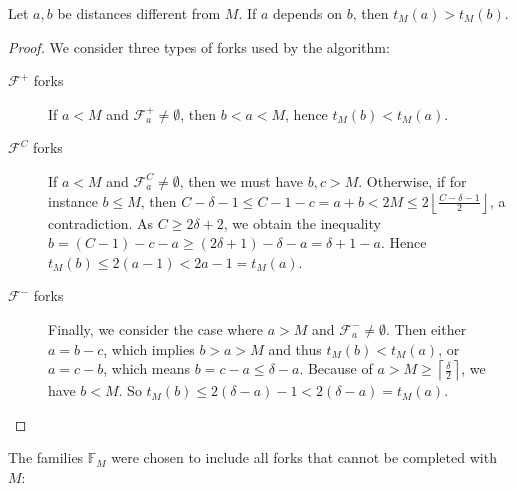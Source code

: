 \documentclass[11pt]{amsart}
\begin{document}
\begin{lemma}\label{lem:expandtime}
Let $a,b$ be distances different from $M$. If $a$ depends on $b$, then $t_M(a) > t_M(b)$.
\end{lemma}
\begin{proof}
We consider three types of forks used by the algorithm:
\begin{description}
\item[$\mathcal F^+$ forks]
If $a<M$ and $\mathcal F^+_a\neq\emptyset$, then $b<a<M$, hence $t_M(b) < t_M(a)$.

\item[$\mathcal F^C$ forks]
If $a < M$ and $\mathcal F^C_a\neq\emptyset$, then we must have $b,c > M$. Otherwise, if for instance $b\leq M$, then $C-\delta-1\leq C-1-c = a+b < 2M \leq 2\left\lfloor \frac{C-\delta-1}{2} \right\rfloor$, a contradiction. As $C\geq 2\delta+2$, we obtain the inequality $b = (C-1)-c-a \geq (2\delta + 1) - \delta - a = \delta+1-a$. Hence $t_M(b) \leq 2(a-1) < 2a-1 = t_M(a)$.

\item[$\mathcal F^-$ forks]
Finally, we consider the case where $a > M$ and $\mathcal F^-_a\neq\emptyset$. Then either $a = b-c$, which implies $b>a>M$ and thus $t_M(b)<t_M(a)$, or $a = c-b$, which means $b = c-a\leq \delta-a$. Because of $a>M\geq \left\lceil\frac{\delta}{2}\right\rceil$, we have $b<M$. So $t_M(b) \leq 2(\delta-a) - 1 < 2(\delta-a) = t_M(a)$.
\end{description}
\end{proof}

The families $\mathbb F_M$ were chosen to include all forks that cannot be completed with $M$:
\end{document}
